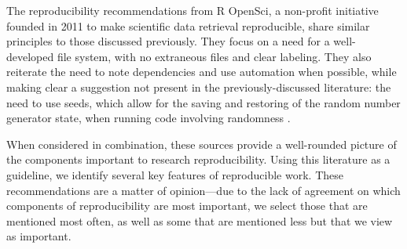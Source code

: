 \documentclass[APA,LATO1COL]{WileyNJD-v2}\usepackage[]{graphicx}\usepackage[]{color}
\begin{document}
The reproducibility recommendations from R OpenSci, a non-profit initiative founded in 2011 to make scientific data retrieval reproducible, share similar principles to those discussed previously. They focus on a need for a well-developed file system, with no extraneous files and clear labeling. They also reiterate the need to note dependencies and use automation when possible, while making clear a suggestion not present in the previously-discussed literature: the need to use seeds, which allow for the saving and restoring of the random number generator state, when running code involving randomness \citep{r-opensci}.

When considered in combination, these sources provide a well-rounded picture of the components important to research reproducibility. Using this literature as a guideline, we identify several key features of reproducible work. These recommendations are a matter of opinion---due to the lack of agreement on which components of reproducibility are most important, we select those that are mentioned most often, as well as some that are mentioned less but that we view as important. 
\vspace{3mm}
\end{document}

